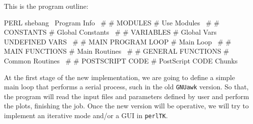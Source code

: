 \documentclass[11pt]{article}
\def\nwendcode{\endtrivlist \endgroup} %
\let\nwdocspar=\par                    %
\begin{document}

\newpage
{}
\setcounter{page}{1}
\pagestyle{fancy}
\renewcommand{\sectionmark}[1]{\markboth{}{\textbf{\prog}\hspace{4ex}\thesection.\ #1}} 
\renewcommand{\subsectionmark}[1]{\markboth{}{\textbf{\prog}\hspace{4ex}\thesubsection.\ \textsl{#1}}}

\tableofcontents

\clearpage

\listoftables

\listoffigures


\newpage
{}
\setcounter{page}{1}


This is the {\prog} program outline:

\nwenddocs{}\endmoddef
\LA{}PERL shebang~{\nwtagstyle{}}\RA{}
\LA{}Program Info~{\nwtagstyle{}}\RA{}
#
# MODULES
#
\LA{}Use Modules~{\nwtagstyle{}}\RA{}
#
# CONSTANTS
#
\LA{}Global Constants~{\nwtagstyle{}}\RA{}
#
# VARIABLES
#
\LA{}Global Vars~{\nwtagstyle{}}\RA{}
\LA{}UNDEFINED VARS~{\nwtagstyle{}}\RA{}
#
# MAIN PROGRAM LOOP
#
\LA{}Main Loop~{\nwtagstyle{}}\RA{}
#
# MAIN FUNCTIONS
#
\LA{}Main Routines~{\nwtagstyle{}}\RA{}
#
# GENERAL FUNCTIONS
#
\LA{}Common Routines~{\nwtagstyle{}}\RA{}
#
# POSTSCRIPT CODE
#
\LA{}PostScript CODE Chunks~{\nwtagstyle{}}\RA{}
\nwendcode{}\nwdocspar


At the first stage of the new {\prog} implementation, we are going to define a simple main loop that performs a serial process, such in the old {\tt{}GNUawk} version. So that, the program will read the input files and parameters defined by user and perform the plots, finishing the job. Once the new version will be operative, we will try to implement an iterative mode and/or a GUI in {\tt{}perlTK}.  
\end{document}
